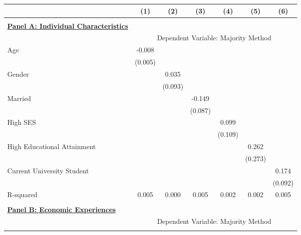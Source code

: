 \begin{table}
\begin{adjustbox}{width=\columnwidth,center}
\begin{tabular}{l*{6}{c}} \hline \hline
                &\multicolumn{1}{c}{(1)}&\multicolumn{1}{c}{(2)}&\multicolumn{1}{c}{(3)}&\multicolumn{1}{c}{(4)}&\multicolumn{1}{c}{(5)}&\multicolumn{1}{c}{(6)}\\
\hline \\ 
\textbf{\underline{Panel A: Individual Characteristics}} &&&&&& \\ 
& \multicolumn{6}{c}{Dependent Variable: Majority Method} \\ \cmidrule(lr){2-7} 
Age             &   -0.008&         &         &         &         &         \\
                &  (0.005)&         &         &         &         &         \\
[1em]
Gender          &         &    0.035&         &         &         &         \\
                &         &  (0.093)&         &         &         &         \\
[1em]
Married         &         &         &   -0.149&         &         &         \\
                &         &         &  (0.087)&         &         &         \\
[1em]
 High SES       &         &         &         &    0.099&         &         \\
                &         &         &         &  (0.109)&         &         \\
[1em]
High Educational Attainment&         &         &         &         &    0.262&         \\
                &         &         &         &         &  (0.273)&         \\
[1em]
Current University Student&         &         &         &         &         &    0.174\\
                &         &         &         &         &         &  (0.092)\\
R-squared       &    0.005&    0.000&    0.005&    0.002&    0.002&    0.005\\
\hline \\ \textbf{\underline {Panel B: Economic Experiences}}&&&&&&& \\ & \multicolumn{6}{c}{Dependent Variable: Majority Method} \\ \cmidrule(lr){2-7} \\

\end{tabular}
\end{adjustbox}
\end{table}
